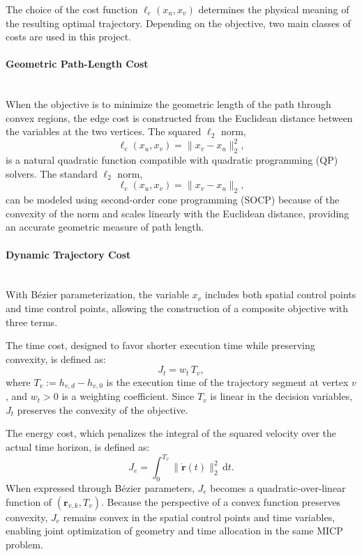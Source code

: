 The choice of the cost function $\ell_e(x_u, x_v)$ determines the physical meaning
of the resulting optimal trajectory. Depending on the objective, two main classes
of costs are used in this project.

\paragraph{Geometric Path-Length Cost}\mbox{}\\

When the objective is to minimize the geometric length of the path through convex
regions, the edge cost is constructed from the Euclidean distance between the
variables at the two vertices. The squared $\ell_2$ norm,
\[
  \ell_e(x_u, x_v) = \|x_v - x_u\|_2^2,
\]
is a natural quadratic function compatible with quadratic programming (QP)
solvers. The standard $\ell_2$ norm,
\[
  \ell_e(x_u, x_v) = \|x_v - x_u\|_2,
\]
can be modeled using second-order cone programming (SOCP) because of the convexity
of the norm and scales linearly with the Euclidean distance, providing an
accurate geometric measure of path length.

\paragraph{Dynamic Trajectory Cost}\mbox{}\\

With Bézier parameterization, the variable $x_v$ includes both spatial control
points and time control points, allowing the construction of a composite objective
with three terms.

The time cost, designed to favor shorter execution time while preserving convexity,
is defined as:
\begin{equation}
  J_t = w_t\, T_v,
  \label{eq:time_cost}
\end{equation}
where $T_v := h_{v,d} - h_{v,0}$ is the execution time of the trajectory segment
at vertex $v$, and $w_t > 0$ is a weighting coefficient.
Since $T_v$ is linear in the decision variables, $J_t$ preserves the convexity of
the objective.

The energy cost, which penalizes the integral of the squared velocity over the
actual time horizon, is defined as:
\begin{equation}
  J_e = \int_0^{T_v} \|\dot{\mathbf{r}}(t)\|_2^2\, \mathrm{d}t.
  \label{eq:energy_cost}
\end{equation}
When expressed through Bézier parameters, $J_e$ becomes a quadratic-over-linear
function of $(\mathbf{r}_{v,k}, T_v)$.
Because the perspective of a convex function preserves convexity, $J_e$ remains
convex in the spatial control points and time variables, enabling joint optimization
of geometry and time allocation in the same MICP problem.

